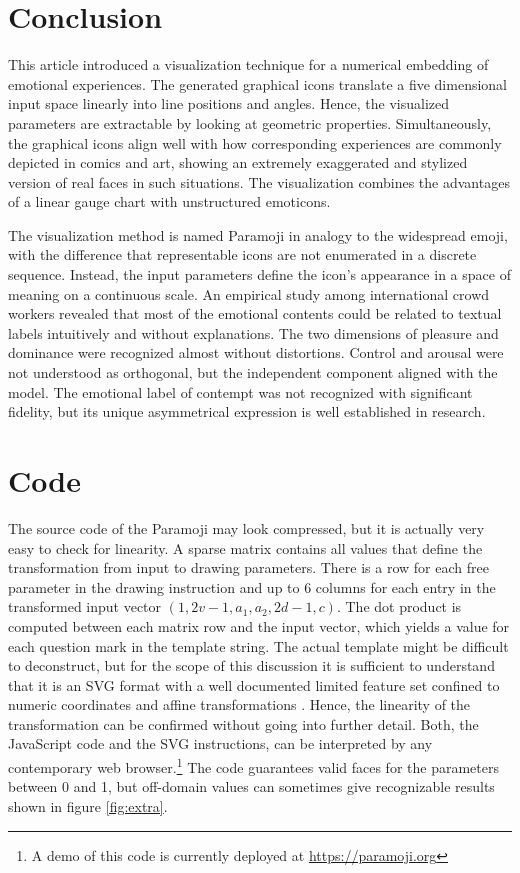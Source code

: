 \section{Conclusion}

This article introduced a visualization technique for a numerical embedding of emotional experiences.
The generated graphical icons translate a five dimensional input space linearly into line positions and angles.
Hence, the visualized parameters are extractable by looking at geometric properties. Simultaneously, the
graphical icons align well with how corresponding experiences are commonly depicted in comics and art,
showing an extremely exaggerated and stylized version of real faces in such situations.
The visualization combines the advantages of a linear gauge chart with unstructured emoticons.

The visualization method is named Paramoji in analogy to the widespread emoji, with the difference
that representable icons are not enumerated in a discrete sequence. Instead, the input parameters
define the icon's appearance in a space of meaning on a continuous scale. An empirical study among
international crowd workers revealed that most of the emotional contents could be related to
textual labels intuitively and without explanations. The two dimensions of pleasure and dominance
were recognized almost without distortions. Control and arousal were not understood as
orthogonal, but the independent component aligned with the model. The emotional label of contempt was not
recognized with significant fidelity, but its unique asymmetrical expression is well established in research.

\section*{Code}

The source code of the Paramoji may look compressed, but it is actually very easy to check for linearity.
A sparse matrix contains all values that define the transformation from input to drawing parameters.
There is a row for each free parameter in the drawing instruction and up to 6 columns
for each entry in the transformed input vector $(1, 2v-1, a_1, a_2, 2d-1, c)$.
The dot product is computed between each matrix row and the input vector,
which yields a value for each question mark in the template string.
The actual template might be difficult to deconstruct, but for the
scope of this discussion it is sufficient to understand that it is an SVG format
with a well documented limited feature set confined to numeric coordinates and affine transformations \cite{svg12}.
Hence, the linearity of the transformation can be confirmed without going into further detail.
Both, the JavaScript code and the SVG instructions, can be interpreted by any contemporary
web browser.\footnote{A demo of this code is currently deployed at \url{https://paramoji.org}}
The code guarantees valid faces for the parameters between 0 and 1, but off-domain values
can sometimes give recognizable results shown in figure \ref{fig:extra}.

